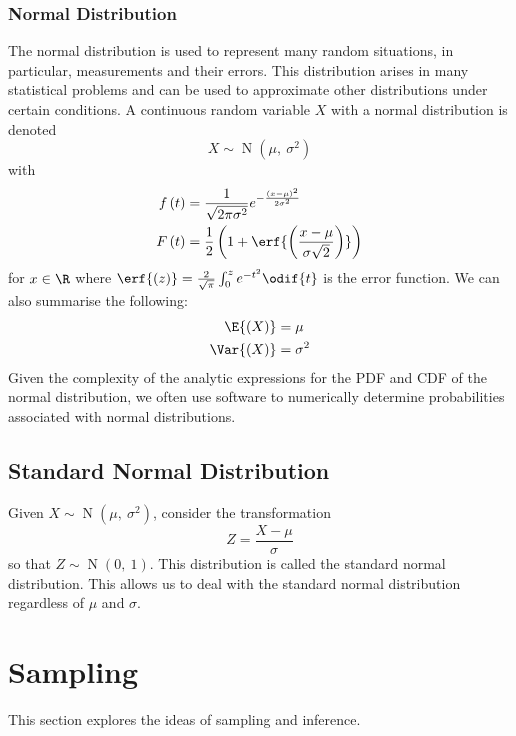 \documentclass{article}
\begin{document}
\subsubsection{Normal Distribution}
The normal distribution is used to represent many random situations, in
particular, measurements and their errors. This distribution arises in
many statistical problems and can be used to \linebreak approximate
other distributions under certain conditions. A continuous random
variable \(X\) with a normal distribution is denoted
\begin{equation*}
    X \sim \operatorname{N}{\left( \mu,\: \sigma^2 \right)}
\end{equation*}
with
\begin{align*}
    f\left( t \right) & = \frac{1}{\sqrt{2 \pi \sigma^2}} e^{-\frac{\left( x - \mu \right)^2}{2 \sigma^2}}    \\
    F\left( t \right) & = \frac{1}{2} \left( 1 + \erf{\left( \frac{x - \mu}{\sigma \sqrt{2}} \right)} \right)
\end{align*}
for \(x \in \R\) where \(\erf{\left( z \right)} = \frac{2}{\sqrt{\pi}} \int_0^z e^{-t^2} \odif{t}\) is the error function.
We can also summarise the following:
\begin{align*}
    \E{\left( X \right)}   & = \mu      \\
    \Var{\left( X \right)} & = \sigma^2
\end{align*}
Given the complexity of the analytic expressions for the PDF and CDF of
the normal distribution, we often use software to numerically determine
probabilities associated with normal distributions.
\subsection{Standard Normal Distribution}
Given \(X \sim \operatorname{N}{\left( \mu,\: \sigma^2 \right)}\),
consider the transformation
\begin{equation*}
    Z = \frac{X - \mu}{\sigma}
\end{equation*}
so that \(Z \sim \operatorname{N}{\left( 0,\: 1 \right)}\). This
distribution is called the standard normal distribution. This allows us
to deal with the standard normal distribution regardless of \(\mu\) and
\(\sigma\).
\section{Sampling}
This section explores the ideas of sampling and inference.
\end{document}
